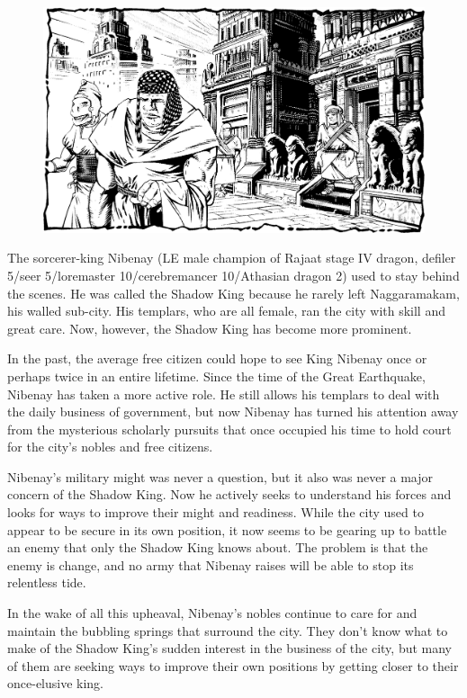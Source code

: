 {
\begin{figure}[b!]
\centering
\includegraphics[width=\textwidth]{images/nibenay-2.png}
\end{figure}

	The sorcerer-king Nibenay (LE male champion of Rajaat stage IV dragon, defiler 5/seer 5/loremaster 10/cerebremancer 10/Athasian dragon 2) used to stay behind the scenes. He was called the Shadow King because he rarely left Naggaramakam, his walled sub-city. His templars, who are all female, ran the city with skill and great care. Now, however, the Shadow King has become more prominent.

	In the past, the average free citizen could hope to see King Nibenay once or perhaps twice in an entire lifetime. Since the time of the Great Earthquake, Nibenay has taken a more active role. He still allows his templars to deal with the daily business of government, but now Nibenay has turned his attention away from the mysterious scholarly pursuits that once occupied his time to hold court for the city's nobles and free citizens.

	Nibenay's military might was never a question, but it also was never a major concern of the Shadow King. Now he actively seeks to understand his forces and looks for ways to improve their might and readiness. While the city used to appear to be secure in its own position, it now seems to be gearing up to battle an enemy that only the Shadow King knows about. The problem is that the enemy is change, and no army that Nibenay raises will be able to stop its relentless tide.

	In the wake of all this upheaval, Nibenay's nobles continue to care for and maintain the bubbling springs that surround the city. They don't know what to make of the Shadow King's sudden interest in the business of the city, but many of them are seeking ways to improve their own positions by getting closer to their once-elusive king.
}
